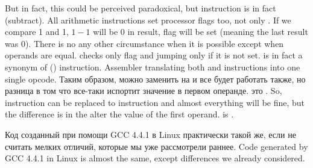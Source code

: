 \label{CMPandSUB}
{But in fact, this could be perceived paradoxical, but \CMP instruction is in fact \SUB (subtract).}
{All arithmetic instructions set processor flags too, not only \CMP.}
{If we compare 1 and 1, $1-1$ will be $0$ in result, \ZF flag will be set (meaning the last result was $0$).}
{There is no any other circumstance when it is possible except when operands are equal.}
{\JNE checks only \ZF flag and jumping only if it is not set. 
\JNE is in fact a synonym of \JNZ () instruction.}
{Assembler translating both \JNE and \JNZ instructions into one single opcode.}
\IFRU
{Таким образом, можно \CMP заменить на \SUB и все будет работать также, но разница в том что \SUB 
все-таки испортит значение в первом операнде. \CMP это .}
{So, \CMP instruction can be replaced to \SUB instruction and almost everything will be fine,
but the difference is in 
the \SUB alter the value of the first operand.
\CMP is .}

\IFRU
{Код созданный при помощи GCC 4.4.1 в Linux практически такой же, если не считать мелких отличий, 
которые мы уже рассмотрели раннее.}
{Code generated by GCC 4.4.1 in Linux is almost the same, except differences we already considered.}


